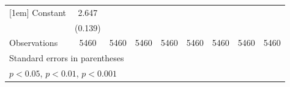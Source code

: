 \begin{table}[htbp]
\begin{tabular}{l*{8}{c}}
[1em]
Constant        &    2.647\sym{***}&                  &                  &                  &                  &                  &                  &                  \\
                &  (0.139)         &                  &                  &                  &                  &                  &                  &                  \\
\hline
Observations    &     5460         &     5460         &     5460         &     5460         &     5460         &     5460         &     5460         &     5460         \\
\hline\hline
\multicolumn{9}{l}{\footnotesize Standard errors in parentheses}\\
\multicolumn{9}{l}{\footnotesize \sym{*} \(p<0.05\), \sym{**} \(p<0.01\), \sym{***} \(p<0.001\)}\\
\end{tabular}
\end{table}
